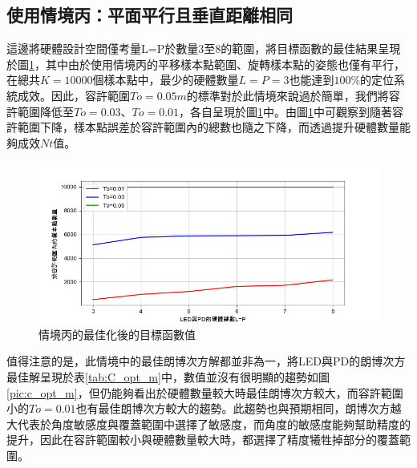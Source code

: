 
    \subsection{使用情境丙：平面平行且垂直距離相同}
    \label{chp:optimize_C}

    這邊將硬體設計空間僅考量L=P於數量3至8的範圍，將目標函數的最佳結果呈現於圖\ref{pic:opt_C_line}，其中由於使用情境丙的平移樣本點範圍、旋轉樣本點的姿態也僅有平行，在總共$K=10000$個樣本點中，最少的硬體數量$L=P=3$也能達到$100\%$的定位系統成效。因此，容許範圍$To=0.05m$的標準對於此情境來說過於簡單，我們將容許範圍降低至$To=0.03$、$To=0.01$，各自呈現於圖\ref{pic:opt_C_line}中。由圖\ref{pic:opt_C_line}中可觀察到隨著容許範圍下降，樣本點誤差於容許範圍內的總數也隨之下降，而透過提升硬體數量能夠成效$Nt$值。
    
    \begin{figure}[htpb]
        \centering
        \includegraphics[width=15cm]{ch5pic/optimize_C.png}
        \caption{情境丙的最佳化後的目標函數值}
        \label{pic:opt_C_line}
    \end{figure}

    
    值得注意的是，此情境中的最佳朗博次方解都並非為一，將LED與PD的朗博次方最佳解呈現於表\ref{tab:C_opt_m}中，數值並沒有很明顯的趨勢如圖\ref{pic:c_opt_m}，但仍能夠看出於硬體數量較大時最佳朗博次方較大，而容許範圍小的$To=0.01$也有最佳朗博次方較大的趨勢。此趨勢也與預期相同，朗博次方越大代表於角度敏感度與覆蓋範圍中選擇了敏感度，而角度的敏感度能夠幫助精度的提升，因此在容許範圍較小與硬體數量較大時，都選擇了精度犧牲掉部分的覆蓋範圍。

